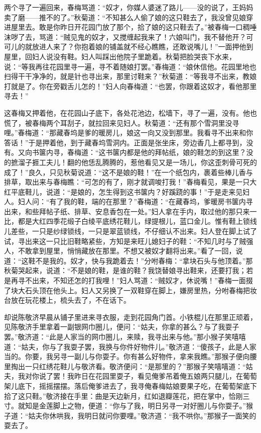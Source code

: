 两个寻了一遍回来，春梅骂道：“奴才，你媒人婆迷了路儿——没的说了，王妈妈卖了磨——推不的了。”秋菊道：“不知甚么人偷了娘的这只鞋去了，我没曾见娘穿进屋里去。敢是你昨日开花园门放了那个，拾了娘的这只鞋去了。”被春梅一口稠唾沫哕了去，骂道：“贼见鬼的奴才，又搅缠起我来了！六娘叫门，我不替他开？可可儿的就放进人来了？你抱着娘的铺盖就不经心瞧瞧，还敢说嘴儿！”一面押他到屋里，回妇人说没有鞋。妇人叫踩出他院子里跪着。秋菊把脸哭丧下水来，说：“等我再往花园里寻一遍，寻不着随娘打罢。”春梅道：“娘休信他。花园里地也扫得干干净净的，就是针也寻出来，那里讨鞋来？”秋菊道：“等我寻不出来，教娘打就是了。你在旁戳舌儿怎的！”妇人向春梅道：“也罢，你跟着这奴才，看他那里寻去！”

这春梅又押着他，在花园山子底下，各处花池边，松墙下，寻了一遍，没有。他也慌了，被春梅两个耳刮子，就拉回来见妇人。秋菊道：“还有那个雪洞里没寻哩。”春梅道：“那藏春坞是爹的暖房儿，娘这一向又没到那里。我看寻不出来和你答话！”于是押着他，到于藏春坞雪洞内。正面是张坐床，旁边香几上都寻到，没有。又向书箧内寻，春梅道：“这书箧内都是他的拜帖纸，娘的鞋怎的到这里？没的摭溜子捱工夫儿！翻的他恁乱腾腾的，惹他看见又是一场儿，你这歪刺骨可死的成了！”良久，只见秋菊说道：“这不是娘的鞋！”在一个纸包内，裹着些棒儿香与排草，取出来与春梅瞧：“可怎的有了，刚才就调唆打我！”春梅看见，果是一只大红平底鞋儿，说道：“是娘的，怎生得到这书箧内？好蹊跷的事！”于是走来见妇人。妇人问：“有了我的鞋，端的在那里？”春梅道：“在藏春坞，爹暖房书箧内寻出来，和些拜帖子纸、排草、安息香包在一处。”妇人拿在手内，取过他的那只来一比，都是大红四季花缎子白绫平底绣花鞋儿，绿提根儿，蓝口金儿。惟有鞋上锁线儿差些，一只是纱绿锁线，一只是翠蓝锁线，不仔细认不出来。妇人登在脚上试了试，寻出来这一只比旧鞋略紧些，方知是来旺儿媳妇子的鞋：“不知几时与了贼强人，不敢拿到屋里，悄悄藏放在那里。不想又被奴才翻将出来。”看了一回，说道：“这鞋不是我的。奴才，快与我跪着去！”分咐春梅：“拿块石头与他顶着。”那秋菊哭起来，说道：“不是娘的鞋，是谁的鞋？我饶替娘寻出鞋来，还要打我；若是再寻不出来，不知还怎的打我哩！”妇人骂道：“贼奴才，休说嘴！”春梅一面掇了块大石头顶在他头上。妇人又另换了一双鞋穿在脚上，嫌房里热，分咐春梅把妆台放在玩花楼上，梳头去了，不在话下。

却说陈敬济早晨从铺子里进来寻衣服，走到花园角门首。小铁棍儿在那里正顽着，见陈敬济手里拿着一副银网巾圈儿，便问：“姑夫，你拿的甚么？与了我耍子罢。”敬济道：“此是人家当的网巾圈儿，来赎，我寻出来与他。”那小猴子笑嘻嘻道：“姑夫，你与了我耍子罢，我换与你件好物件儿。”敬济道：“傻孩子，此是人家当的。你要，我另寻一副儿与你耍子。你有甚么好物件，拿来我瞧。”那猴子便向腰里掏出一只红绣花鞋儿与敬济看。敬济便问：“是那里的？”那猴子笑嘻嘻道：“姑夫，我对你说了罢！我昨日在花园里耍子，看见俺爹吊着俺五娘两只腿儿，在葡萄架儿底下，摇摇摆摆。落后俺爹进去了，我寻俺春梅姑娘要果子吃，在葡萄架底下拾了这只鞋。”敬济接在手里：曲是天边新月，红如退瓣莲花，把在掌中，恰刚三寸。就知是金莲脚上之物，便道：“你与了我，明日另寻一对好圈儿与你耍子。”猴子道：“姑夫你休哄我，我明日就问你要哩。”敬济道：“我不哄你。”那猴子一面笑的耍去了。

